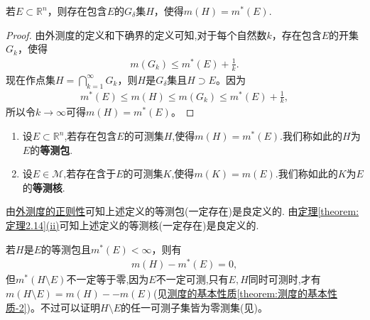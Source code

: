 \documentclass[../../main.tex]{subfiles}%
\begin{document}
\begin{theorem}[外测度的正则性]\label{theorem:外测度的正则性}
若\(E \subset \mathbb{R}^n\)，则存在包含\(E\)的\(G_\delta\)集\(H\)，使得\(m(H)=m^*(E)\).
\end{theorem}
\begin{proof}

由外测度的定义和下确界的定义可知,对于每个自然数\(k\)，存在包含\(E\)的开集\(G_k\)，使得
\begin{align*}
m(G_k) \leqslant m^*(E) + \frac{1}{k}.
\end{align*}
现在作点集\(H = \bigcap_{k = 1}^{\infty}G_k\)，则\(H\)是\(G_\delta\)集且\(H \supset E\)。因为
\begin{align*}
m^*(E) \leqslant m(H) \leqslant m(G_k) \leqslant m^*(E) + \frac{1}{k},
\end{align*}
所以令$k\to \infty$可得\(m(H)=m^*(E)\)。

\end{proof}

\begin{definition}[等测包与等测核]
\begin{enumerate}
\item 设$E\subset \mathbb{R}^n$,若存在包含$E$的可测集$H$,使得$m(H)=m^*(E)$.我们称如此的$H$为$E$的\textbf{等测包}.

\item 设$E\in \mathscr{M}$,若存在含于$E$的可测集$K$,使得$m(K)=m(E)$.我们称如此的$K$为$E$的\textbf{等测核}.
\end{enumerate}
\end{definition}
\begin{note}
由\hyperref[theorem:外测度的正则性]{外测度的正则性}可知上述定义的等测包(一定存在)是良定义的.
由\hyperref[theorem:定理2.14]{定理\ref{theorem:定理2.14}(ii)}可知上述定义的等测核(一定存在)是良定义的.
\end{note}
\begin{remark}
若\(H\)是\(E\)的等测包且\(m^*(E)<\infty\)，则有
\begin{align*}
m(H) - m^*(E) = 0,
\end{align*}
但\(m^*(H\setminus E)\)不一定等于零,因为$E$不一定可测,只有$E,H$同时可测时,才有$m(H\setminus E)=m(H)--m(E)$(见\hyperref[theorem:测度的基本性质]{测度的基本性质\ref{theorem:测度的基本性质-2}})。不过可以证明\(H\setminus E\)的任一可测子集皆为零测集(见)。
\end{remark}
\end{document}
